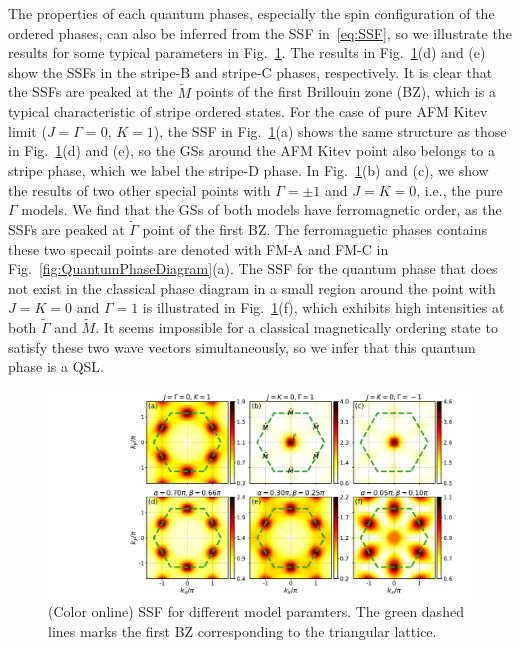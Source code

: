 \documentclass[aps,prb,reprint,amsfonts,amsmath,amssymb,showpacs,groupedaddress,superscriptaddress]{revtex4-1}
\begin{document}
The properties of each quantum phases, especially the spin configuration of the ordered phases, can also be inferred from the SSF in~\eqref{eq:SSF},  so we illustrate the results for some typical parameters in Fig.~\ref{fig:StructureFactors}. The results in Fig.~\ref{fig:StructureFactors}(d) and (e) show the SSFs in the stripe-B and stripe-C phases, respectively. It is clear that the SSFs are peaked at the $\tilde{M}$ points of the first Brillouin zone (BZ), which is a typical characteristic of stripe ordered states. For the case of pure AFM Kitev limit ($J=\Gamma=0$, $K=1$), the SSF in Fig.~\ref{fig:StructureFactors}(a) shows the same structure as those in Fig.~\ref{fig:StructureFactors}(d) and (e), so the GSs around the AFM Kitev point also belongs to a stripe phase, which we label the stripe-D phase. In Fig.~\ref{fig:StructureFactors}(b) and (c), we show the results of two other special points with $\Gamma=\pm1$ and $J=K=0$, i.e., the pure $\Gamma$ models. We find that the GSs of both models have ferromagnetic order, as the SSFs are peaked at $\tilde{\Gamma}$ point of the first BZ. The ferromagnetic phases contains these two specail points are denoted with FM-A and FM-C in Fig.~\ref{fig:QuantumPhaseDiagram}(a). The SSF for the quantum phase that does not exist in the classical phase diagram in a small region around the point with $J=K=0$ and $\Gamma=1$ is illustrated in Fig.~\ref{fig:StructureFactors}(f), which exhibits high intensities at both $\tilde{\Gamma}$ and $\tilde{M}$. {\color{red}It seems impossible for a classical magnetically ordering state to satisfy these two wave vectors simultaneously, so we infer that this quantum phase is a QSL.}
\begin{figure}
    \centering
    \includegraphics[width=\columnwidth]{fig/StructureFactors.pdf}
    \caption{\label{fig:StructureFactors}(Color online) SSF for different model paramters. The green dashed lines marks the first BZ corresponding to the triangular lattice.}
\end{figure}
\end{document}
